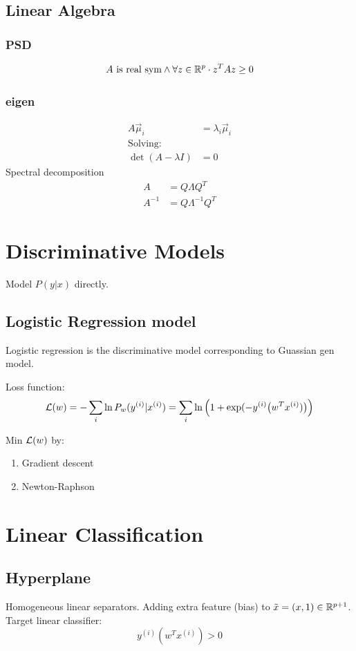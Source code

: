 \documentclass[a4paper]{report}
\begin{document}
\section{Linear Algebra}
\subsection{PSD}
$$
A \text{ is real sym} \wedge\forall z\in \mathbb{R}^p\cdot z^T Az \geq 0
$$
\subsection{eigen}
\begin{align*}
A \vec\mu_i &=\lambda_i \vec\mu_i\\
\text{Solving:} \\
\det(A-\lambda I) &= 0
\end{align*}
Spectral decomposition 
\begin{align*}
A &= Q\Lambda Q^T \\
A^{-1} &=Q\Lambda^{-1}Q^T
\end{align*}

\chapter{Discriminative Models}
Model $P(y|x)$ directly.
\section{Logistic Regression model}
Logistic regression is the discriminative model corresponding to Guassian gen model.

Loss function:
$$
\mathcal{L}(w) = -\sum_{i} \ln {P_w(y^{(i)}|x^{(i)})} = \sum_{i} \ln {\Big(1+\exp(-y^{(i)}\big(w^T x^{(i)})\big)\Big)}
$$

Min $\mathcal{L}(w)$ by:
\begin{enumerate}
\item Gradient descent
\item Newton-Raphson
\end{enumerate}

\chapter{Linear Classification}
\section{Hyperplane} 
Homogeneous linear separators. Adding extra feature (bias) to $\tilde x=(x,1)\in \mathbb{R}^{p+1}$. 
Target linear classifier:
$$
y^{(i)}(w^T x^{(i)}) > 0
$$
\end{document}
